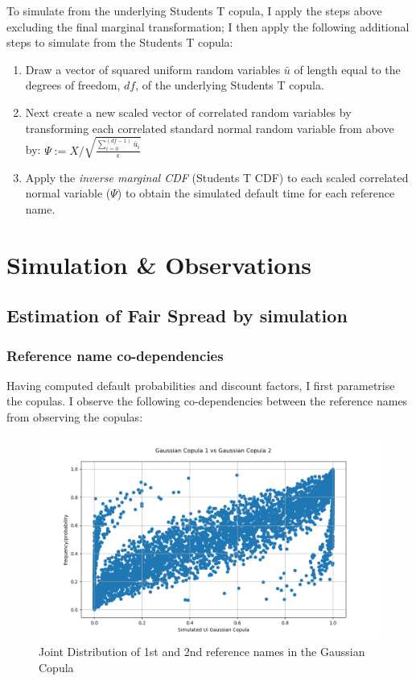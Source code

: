 \documentclass{report}
\theoremstyle{plain}
\theoremstyle{definition}
\begin{document}
To simulate from the underlying Students T copula, I apply the steps above excluding the final marginal transformation; I then apply the following additional steps to simulate from the Students T copula:
\begin{enumerate}
	\item Draw a vector of squared uniform random variables $\bar{u}$ of length equal to the degrees of freedom, $df$, of the underlying Students T copula.
	\item Next create a new scaled vector of correlated random variables by transforming each correlated standard normal random variable from above by: $\Psi := X / \sqrt{\frac{\sum_{i=0}^{(df-1)}\bar{u}_i}{\epsilon}}$
	\item Apply the \emph{inverse marginal CDF} (Students T CDF) to each scaled correlated normal variable ($\Psi$) to obtain the simulated default time for each reference name.
\end{enumerate}


\chapter{Simulation \& Observations}

\section{Estimation of Fair Spread by simulation}

\subsection{Reference name co-dependencies}

Having computed default probabilities and discount factors, I first parametrise the copulas. I observe the following co-dependencies between the reference names from observing the copulas:

\begin{figure}[H]
	\begin{center}
		\includegraphics[width=15cm]{Gaussian_Copula_1_vs_Gaussian_Copula_2.png}
		\caption{Joint Distribution of 1st and 2nd reference names in the Gaussian Copula} 
		\label{Gaussian_Copula_1_vs_Gaussian_Copula_2}
	\end{center}
\end{figure}
\end{document}
